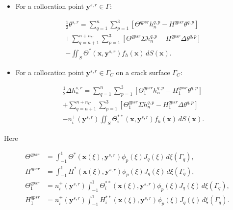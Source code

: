 \begin{itemize}
	
	\item For a collocation point $\mathbf{y}^{s,r}\in\Gamma$:
	
	\begin{multline}
		\frac{1}{2}\theta^{s,r}
		=
		\sum_{q=1}^{n}\sum_{p=1}^{3}
		\left[
		\Theta^{qpsr}h_{n}^{q,p}
		-
		H^{qpsr}\theta^{q,p}
		\right]
		\\
		+
		\sum_{q=n+1}^{n+n_{C}}\sum_{p=1}^{3}
		\left[
		\Theta^{qpsr}\Sigma h_{n}^{q,p}
		-
		H^{qpsr}\Delta\theta^{q,p}
		\right]
		\\
		-
		\iint_{S}
		\Theta^{*}(\mathbf{x},\mathbf{y}^{s,r})
		f_{h}(\mathbf{x})
		\,dS(\mathbf{x}).
		\label{KushnirEq17}
	\end{multline}
	
	\item For a collocation point $\mathbf{y}^{s,r}\in\Gamma_{C}$ on a crack
	surface $\Gamma_{C}$:
	
	\begin{multline}
		\frac{1}{2}\Delta h_{n}^{s,r}
		=
		\sum_{q=1}^{n}\sum_{p=1}^{3}
		\left[
		\Theta_{1}^{qpsr}h_{n}^{q,p}
		-
		H_{1}^{qpsr}\theta^{q,p}
		\right]
		\\
		+
		\sum_{q=n+1}^{n+n_{C}}\sum_{p=1}^{3}
		\left[
		\Theta_{1}^{qpsr}\Sigma h_{n}^{q,p}
		-
		H_{1}^{qpsr}\Delta\theta^{q,p}
		\right]
		\\
		-
		n_{i}^{+}(\mathbf{y}^{s,r})
		\iint_{S}
		\Theta_{i}^{**}(\mathbf{x},\mathbf{y}^{s,r})
		f_{h}(\mathbf{x})
		\,dS(\mathbf{x}).
		\label{KushnirEq18}
	\end{multline}
	
\end{itemize}
%
Here

\begin{equation}
	\begin{aligned}
		\Theta^{qpsr}
		&=
		\int_{-1}^{1}
		\Theta^{*}(\mathbf{x}(\xi),\mathbf{y}^{s,r})
		\phi_{p}(\xi)
		J_{q}(\xi)
		\,d\xi(\Gamma_{q}),
		\\ 
		H^{qpsr}
		&=
		\int_{-1}^{1}
		H^{*}(\mathbf{x}(\xi),\mathbf{y}^{s,r})
		\phi_{p}(\xi)
		J_{q}(\xi)
		\,d\xi(\Gamma_{q}),
		\\ 
		\Theta_{1}^{qpsr}
		&=
		n_{i}^{+}(\mathbf{y}^{s,r})
		\int_{-1}^{1}
		\Theta_{i}^{**}(\mathbf{x}(\xi),\mathbf{y}^{s,r})
		\phi_{p}(\xi)
		J_{q}(\xi)
		\,d\xi(\Gamma_{q}),
		\\ 
		H_{1}^{qpsr}
		&=
		n_{i}^{+}(\mathbf{y}^{s,r})
		\int_{-1}^{1}
		H_{i}^{**}(\mathbf{x}(\xi),\mathbf{y}^{s,r})
		\phi_{p}(\xi)
		J_{q}(\xi)
		\,d\xi(\Gamma_{q}).
	\end{aligned}
	\label{KushnirEq19}
\end{equation}

